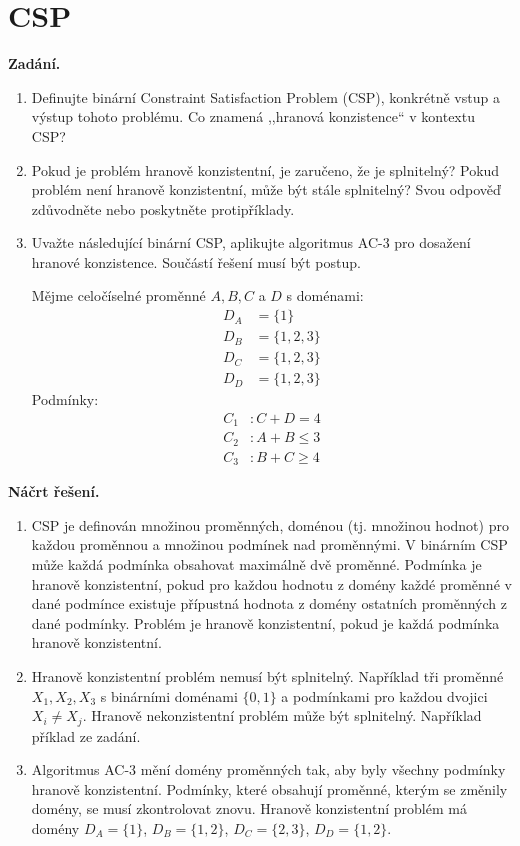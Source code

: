 \section{CSP}

\noindent\textbf{Zadání.}\par
\begin{enumerate}[nosep]
  \item Definujte binární Constraint Satisfaction Problem (CSP), konkrétně vstup a výstup tohoto problému. Co znamená ,,hranová konzistence`` v kontextu CSP?
  \item Pokud je problém hranově konzistentní, je zaručeno, že je splnitelný? Pokud problém není hranově konzistentní, může být stále splnitelný? Svou odpověď zdůvodněte nebo poskytněte protipříklady.
  \item Uvažte následující binární CSP, aplikujte algoritmus AC-3 pro dosažení hranové konzistence. Součástí řešení musí být postup.

  Mějme celočíselné proměnné $A, B, C$ a $D$ s doménami:
  \begin{align*}
    D_A &= \{1\} \\
    D_B &= \{1, 2, 3\} \\
    D_C &= \{1, 2, 3\} \\
    D_D &= \{1, 2, 3\}
  \end{align*}
  Podmínky:
  \begin{align*}
    C_1 &: C + D = 4 \\
    C_2 &: A + B \leq 3 \\
    C_3 &: B + C \geq 4
  \end{align*}
\end{enumerate}

\medskip
\noindent\textbf{Náčrt řešení.}\par
\begin{enumerate}[nosep]
  \item CSP je definován množinou proměnných, doménou (tj. množinou hodnot) pro každou proměnnou a množinou podmínek nad proměnnými. V binárním CSP může každá podmínka obsahovat maximálně dvě proměnné. Podmínka je hranově konzistentní, pokud pro každou hodnotu z domény každé proměnné v dané podmínce existuje přípustná hodnota z domény ostatních proměnných z dané podmínky. Problém je hranově konzistentní, pokud je každá podmínka hranově konzistentní.
  \item Hranově konzistentní problém nemusí být splnitelný. Například tři proměnné $X_1, X_2, X_3$ s binárními doménami $\{0, 1\}$ a podmínkami pro každou dvojici $X_i \neq X_j$. Hranově nekonzistentní problém může být splnitelný. Například příklad ze zadání.
  \item Algoritmus AC-3 mění domény proměnných tak, aby byly všechny podmínky hranově konzistentní. Podmínky, které obsahují proměnné, kterým se změnily domény, se musí zkontrolovat znovu. Hranově konzistentní problém má domény $D_A = \{1\}$, $D_B = \{1, 2\}$, $D_C = \{2, 3\}$, $D_D = \{1, 2\}$.
\end{enumerate}

